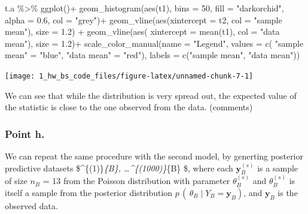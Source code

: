 \documentclass[
  11pt,
]{article}
\newenvironment{Shaded}{\begin{snugshade}}{\end{snugshade}}
\newcommand{\AttributeTok}[1]{\textcolor[rgb]{0.77,0.63,0.00}{#1}}
\newcommand{\DecValTok}[1]{\textcolor[rgb]{0.00,0.00,0.81}{#1}}
\newcommand{\FloatTok}[1]{\textcolor[rgb]{0.00,0.00,0.81}{#1}}
\newcommand{\FunctionTok}[1]{\textcolor[rgb]{0.00,0.00,0.00}{#1}}
\newcommand{\NormalTok}[1]{#1}
\newcommand{\OtherTok}[1]{\textcolor[rgb]{0.56,0.35,0.01}{#1}}
\newcommand{\SpecialCharTok}[1]{\textcolor[rgb]{0.00,0.00,0.00}{#1}}
\newcommand{\StringTok}[1]{\textcolor[rgb]{0.31,0.60,0.02}{#1}}
\begin{document}
\begin{Shaded}
\begin{Highlighting}[]
\NormalTok{t.a }\SpecialCharTok{\%\textgreater{}\%} \FunctionTok{ggplot}\NormalTok{()}\SpecialCharTok{+}
  \FunctionTok{geom\_histogram}\NormalTok{(}\FunctionTok{aes}\NormalTok{(t1), }\AttributeTok{bins =} \DecValTok{50}\NormalTok{, }\AttributeTok{fill =} \StringTok{"darkorchid"}\NormalTok{, }\AttributeTok{alpha =} \FloatTok{0.6}\NormalTok{, }\AttributeTok{col =} \StringTok{"grey"}\NormalTok{)}\SpecialCharTok{+}
  \FunctionTok{geom\_vline}\NormalTok{(}\FunctionTok{aes}\NormalTok{(}\AttributeTok{xintercept =}\NormalTok{ t2, }\AttributeTok{col =} \StringTok{"sample mean"}\NormalTok{), }\AttributeTok{size =} \FloatTok{1.2}\NormalTok{) }\SpecialCharTok{+}
  \FunctionTok{geom\_vline}\NormalTok{(}\FunctionTok{aes}\NormalTok{( }\AttributeTok{xintercept =} \FunctionTok{mean}\NormalTok{(t1), }\AttributeTok{col =} \StringTok{"data mean"}\NormalTok{), }\AttributeTok{size =} \FloatTok{1.2}\NormalTok{)}\SpecialCharTok{+}
  \FunctionTok{scale\_color\_manual}\NormalTok{(}\AttributeTok{name =} \StringTok{"Legend"}\NormalTok{, }\AttributeTok{values =} \FunctionTok{c}\NormalTok{( }\StringTok{"sample mean"} \OtherTok{=} \StringTok{"blue"}\NormalTok{, }\StringTok{"data mean"} \OtherTok{=} \StringTok{"red"}\NormalTok{),}
    \AttributeTok{labels =} \FunctionTok{c}\NormalTok{(}\StringTok{"sample mean"}\NormalTok{, }\StringTok{"data mean"}\NormalTok{))}
\end{Highlighting}
\end{Shaded}

\begin{center}\texttt{[image: 1\_hw\_bs\_code\_files/figure-latex/unnamed-chunk-7-1]} \end{center}
\normalsize

We can see that while the distribution is very spread out, the expected
value of the statistic is close to the one observed from the data.
(comments)

\hypertarget{point-h.}{%
\subsubsection{Point h.}\label{point-h.}}

We can repeat the same procedure with the second model, by generting
posterior predictive datasets \$\^{}\{(1)\}\emph{\{B\},
\ldots{}\^{}\{(1000)\}}\{B\} \$, where each
\(\mathbf{y}^{(s)}_{B}\) is a sample of size \(n_B\) = 13 from the
Poisson distribution with parameter \(\theta^{(s)}_{B}\) and
\(\theta^{(s)}_{B}\) is itself a sample from the posterior distribution
\(p \, ( \, \theta_B \; | \; Y_B = \mathbf{y}_B)\), and \(\mathbf{y}_B\)
is the observed data. \scriptsize
\end{document}
